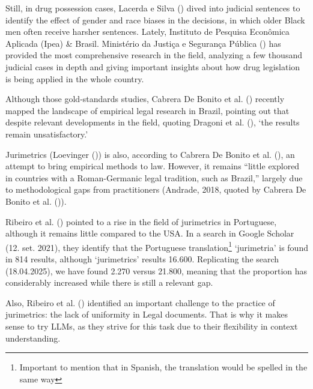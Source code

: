 \documentclass[
  12pt,
]{article}
\begin{document}
Still, in drug possession cases, Lacerda e Silva
() dived into judicial
sentences to identify the effect of gender and race biases in the
decisions, in which older Black men often receive harsher sentences.
Lately, Instituto de Pesquisa Econômica Aplicada (Ipea) \& Brasil.
Ministério da Justiça e Segurança Pública
()
has provided the most comprehensive research in the field, analyzing a
few thousand judicial cases in depth and giving important insights about
how drug legislation is being applied in the whole country.

Although those gold-standards studies, Cabrera De Bonito et al.
() recently mapped
the landscape of empirical legal research in Brazil, pointing out that
despite relevant developments in the field, quoting Dragoni et al.
(), `the results remain
unsatisfactory.'

Jurimetrics (Loevinger
()) is also,
according to Cabrera De Bonito et al.
(), an attempt to
bring empirical methods to law. However, it remains ``little explored in
countries with a Roman-Germanic legal tradition, such as Brazil,''
largely due to methodological gaps from practitioners (Andrade, 2018,
quoted by Cabrera De Bonito et al.
()).

Ribeiro et al. () pointed to
a rise in the field of jurimetrics in Portuguese, although it remains
little compared to the USA. In a search in Google Scholar (12. set.
2021), they identify that the Portuguese translation\footnote{Important
  to mention that in Spanish, the translation would be spelled in the
  same way} `jurimetria' is found in 814 results, although `jurimetrics'
results 16.600. Replicating the search (18.04.2025), we have found 2.270
versus 21.800, meaning that the proportion has considerably increased
while there is still a relevant gap.

Also, Ribeiro et al. ()
identified an important challenge to the practice of jurimetrics: the
lack of uniformity in Legal documents. That is why it makes sense to try
LLMs, as they strive for this task due to their flexibility in context
understanding.
\end{document}
